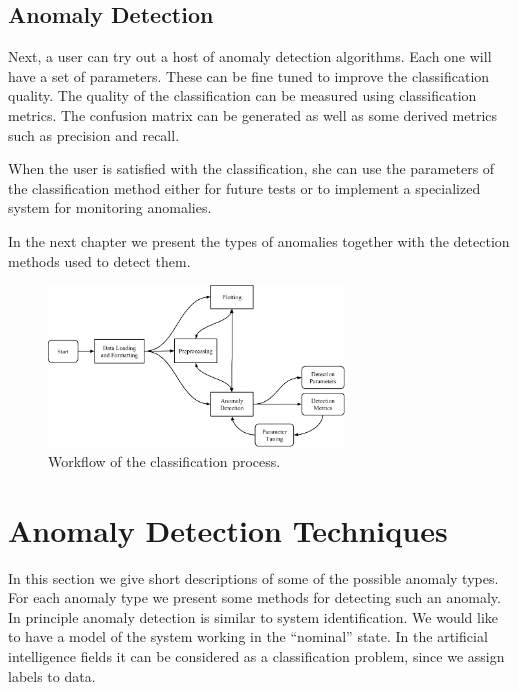 \documentclass[a4paper, 10pt]{article}
\begin{document}
\subsection{Anomaly Detection}

Next, a user can try out a host of anomaly detection algorithms. Each one will have a set of parameters. These can be fine tuned to improve the classification quality. The quality of the classification can be measured using classification metrics. The confusion matrix can be generated as well as some derived metrics such as precision and recall.

When the user is satisfied with the classification, she can use the parameters of the classification method either for future tests or to implement a specialized system for monitoring anomalies.

In the next chapter we present the types of anomalies together with the detection methods used to detect them.

\begin{figure}
\centering
\includegraphics[width=0.7\textwidth]{Workflow}
\caption{Workflow of the classification process.}
\label{fig:workflow}
\end{figure}

\FloatBarrier

\section{Anomaly Detection Techniques \label{methods}}

In this section we give short descriptions of some of the possible anomaly types. For each anomaly type we present some methods for detecting such an anomaly. \\

In principle anomaly detection is similar to system identification. We would like to have a model of the system working in the ``nominal'' state. In the artificial intelligence fields it can be considered as a classification problem, since we assign labels to data.
\end{document}
